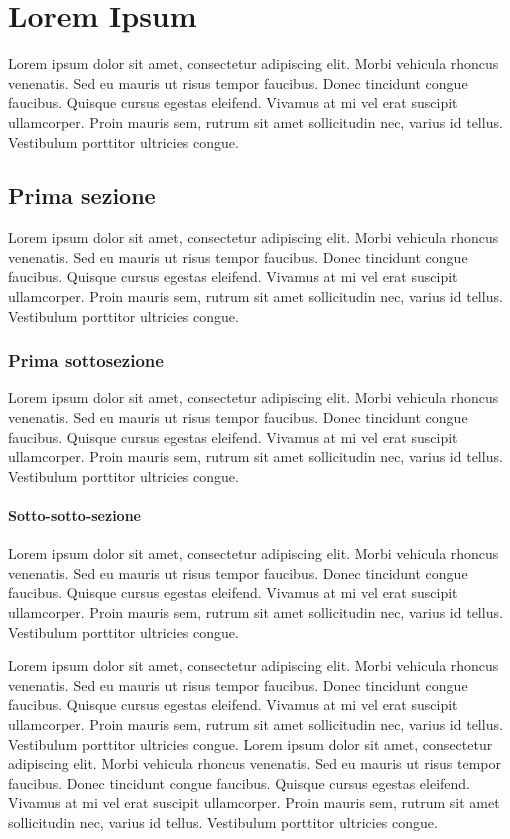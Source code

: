 \chapter{Lorem Ipsum}
Lorem ipsum dolor sit amet, consectetur adipiscing elit. Morbi vehicula rhoncus venenatis. Sed eu mauris ut risus tempor faucibus. Donec tincidunt congue faucibus. Quisque cursus egestas eleifend. Vivamus at mi vel erat suscipit ullamcorper. Proin mauris sem, rutrum sit amet sollicitudin nec, varius id tellus. Vestibulum porttitor ultricies congue.

\section{Prima sezione}
Lorem ipsum dolor sit amet, consectetur adipiscing elit. Morbi vehicula rhoncus venenatis. Sed eu mauris ut risus tempor faucibus. Donec tincidunt congue faucibus. Quisque cursus egestas eleifend. Vivamus at mi vel erat suscipit ullamcorper. Proin mauris sem, rutrum sit amet sollicitudin nec, varius id tellus. Vestibulum porttitor ultricies congue.

\subsection{Prima sottosezione}
Lorem ipsum dolor sit amet, consectetur adipiscing elit. Morbi vehicula rhoncus venenatis. Sed eu mauris ut risus tempor faucibus. Donec tincidunt congue faucibus. Quisque cursus egestas eleifend. Vivamus at mi vel erat suscipit ullamcorper. Proin mauris sem, rutrum sit amet sollicitudin nec, varius id tellus. Vestibulum porttitor ultricies congue.
\subsubsection{Sotto-sotto-sezione}
Lorem ipsum dolor sit amet, consectetur adipiscing elit. Morbi vehicula rhoncus venenatis. Sed eu mauris ut risus tempor faucibus. Donec tincidunt congue faucibus. Quisque cursus egestas eleifend. Vivamus at mi vel erat suscipit ullamcorper. Proin mauris sem, rutrum sit amet sollicitudin nec, varius id tellus. Vestibulum porttitor ultricies congue.
\par 
Lorem ipsum dolor sit amet, consectetur adipiscing elit. Morbi vehicula rhoncus venenatis. Sed eu mauris ut risus tempor faucibus. Donec tincidunt congue faucibus. Quisque cursus egestas eleifend. Vivamus at mi vel erat suscipit ullamcorper. Proin mauris sem, rutrum sit amet sollicitudin nec, varius id tellus. Vestibulum porttitor ultricies congue. Lorem ipsum dolor sit amet, consectetur adipiscing elit. Morbi vehicula rhoncus venenatis. Sed eu mauris ut risus tempor faucibus. Donec tincidunt congue faucibus. Quisque cursus egestas eleifend. Vivamus at mi vel erat suscipit ullamcorper. Proin mauris sem, rutrum sit amet sollicitudin nec, varius id tellus. Vestibulum porttitor ultricies congue.